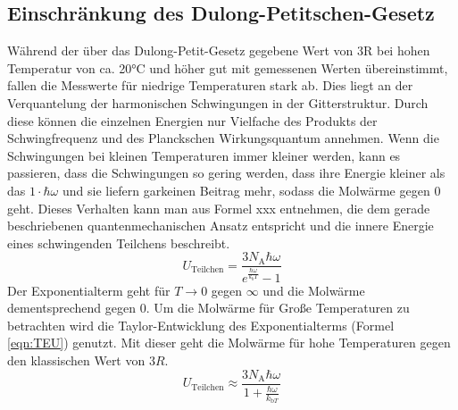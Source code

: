 \documentclass[titlepage = firstcover]{scrartcl}
\begin{document}
          \subsection{Einschränkung des Dulong-Petitschen-Gesetz}
            Während der über das Dulong-Petit-Gesetz gegebene Wert von 3R bei hohen Temperatur von ca. 20°C und höher gut mit gemessenen Werten übereinstimmt,
            fallen die Messwerte für niedrige Temperaturen stark ab. Dies liegt an der Verquantelung der harmonischen Schwingungen in der Gitterstruktur. 
            Durch diese können die einzelnen Energien nur Vielfache des Produkts der Schwingfrequenz und des Planckschen Wirkungsquantum annehmen. Wenn 
            die Schwingungen bei kleinen Temperaturen immer kleiner werden, kann es passieren, dass die Schwingungen so gering werden, dass ihre Energie
            kleiner als das $1 \cdot \hbar \omega$ und sie liefern garkeinen Beitrag mehr, sodass die Molwärme gegen 0 geht. Dieses Verhalten kann man aus Formel
            xxx entnehmen, die dem gerade beschriebenen quantenmechanischen Ansatz entspricht und die innere Energie eines schwingenden Teilchens beschreibt.
            \begin{equation}
              U_{\text{Teilchen}} = \frac{3 N_{\text{A}} \hbar \omega}{e^{\frac{\hbar \omega}{k_bT}}-1}
              \label{eqn:QU}
            \end{equation} 
            Der Exponentialterm geht für $T \rightarrow 0$ gegen $\infty$ und die Molwärme dementsprechend gegen 0. Um die Molwärme für Große Temperaturen
            zu betrachten wird die Taylor-Entwicklung des Exponentialterms (Formel \eqref{eqn:TEU}) genutzt. Mit dieser geht die Molwärme für hohe Temperaturen gegen 
            den klassischen Wert von $3R$.
            \begin{equation}
              U_{\text{Teilchen}} \approx \frac{3 N_{\text{A}} \hbar \omega}{1 + \frac{\hbar \omega}{k_{\text{b}T}}}
              \label{eqn:TEU}
            \end{equation} 

        
        
\end{document}
